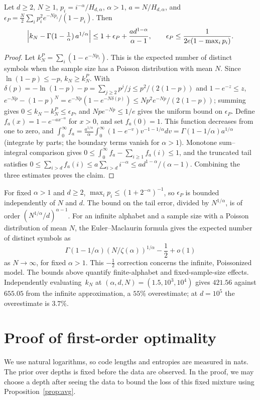 \documentclass[anon]{alt2027}
\begin{document}
\begin{proposition}
\label{prop:discovery}
Let $d\ge2$, $N\ge1$, $p_i=i^{-\alpha}/H_{d,\alpha}$, $\alpha>1$, $a=N/H_{d,\alpha}$, and $\epsilon_P=\frac N2\sum_ip_i^2e^{-Np_i}/(1-p_i)$. Then
\[
\Bigl|k_N-\Gamma(1-\tfrac1\alpha)\,a^{1/\alpha}\Bigr|\le1+\epsilon_P+\frac{ad^{1-\alpha}}{\alpha-1},\qquad \epsilon_P\le\frac{1}{2e(1-\max_ip_i)} .
\]
\end{proposition}
\begin{proof}
Let $k^P_N=\sum_i(1-e^{-Np_i})$. This is the expected number of distinct symbols when the sample size has a Poisson distribution with mean $N$. Since $\ln(1-p)\le-p$, $k_N\ge k^P_N$. With $\delta(p)=-\ln(1-p)-p=\sum_{j\ge2}p^j/j\le p^2/(2(1-p))$ and $1-e^{-z}\le z$, $e^{-Np}-(1-p)^N=e^{-Np}(1-e^{-N\delta(p)})\le Np^2e^{-Np}/(2(1-p))$; summing gives $0\le k_N-k^P_N\le\epsilon_P$, and $Npe^{-Np}\le1/e$ gives the uniform bound on $\epsilon_P$. Define $f_a(x)=1-e^{-ax^{-\alpha}}$ for $x>0$, and set $f_a(0)=1$. This function decreases from one to zero, and $\int_0^\infty f_a=\frac{a^{1/\alpha}}{\alpha}\int_0^\infty(1-e^{-v})v^{-1-1/\alpha}dv=\Gamma(1-1/\alpha)a^{1/\alpha}$ (integrate by parts; the boundary terms vanish for $\alpha>1$). Monotone sum--integral comparison gives $0\le\int_0^\infty f_a-\sum_{i\ge1}f_a(i)\le1$, and the truncated tail satisfies $0\le\sum_{i>d}f_a(i)\le a\sum_{i>d}i^{-\alpha}\le ad^{1-\alpha}/(\alpha-1)$. Combining the three estimates proves the claim.
\end{proof}
For fixed $\alpha>1$ and $d\ge2$, $\max_ip_i\le(1+2^{-\alpha})^{-1}$, so $\epsilon_P$ is bounded independently of $N$ and $d$. The bound on the tail error, divided by $N^{1/\alpha}$, is of order $(N^{1/\alpha}/d)^{\alpha-1}$. For an infinite alphabet and a sample size with a Poisson distribution of mean $N$, the Euler--Maclaurin formula gives the expected number of distinct symbols as \[\Gamma(1-1/\alpha)(N/\zeta(\alpha))^{1/\alpha}-\frac12+o(1)\] as $N\to\infty$, for fixed $\alpha>1$. This $-\frac12$ correction concerns the infinite, Poissonized model. The bounds above quantify finite-alphabet and fixed-sample-size effects. Independently evaluating~$k_N$ at $(\alpha,d,N)=(1.5,10^3,10^4)$ gives $421.56$ against $655.05$ from the infinite approximation, a $55\%$ overestimate; at $d=10^5$ the overestimate is $3.7\%$.

\section{Proof of first-order optimality}
\label{app:optimal}
We use natural logarithms, so code lengths and entropies are measured in nats. The prior over depths is fixed before the data are observed. In the proof, we may choose a depth after seeing the data to bound the loss of this fixed mixture using Proposition~\ref{prop:avg}.
\end{document}
